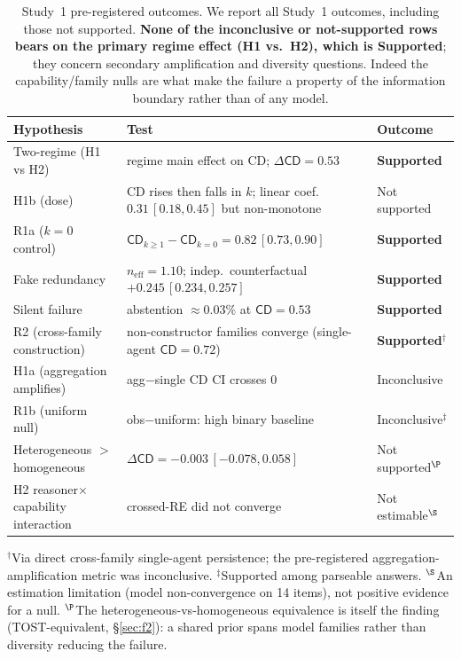 \documentclass[acmsmall,screen,review,anonymous]{acmart}
\newcommand{\cd}{\textsf{CD}}
\newcommand{\neff}{\ensuremath{n_{\mathrm{eff}}}}
\begin{document}
\begin{table}[t]
\centering
\caption{Study~1 pre-registered outcomes. We report all Study~1 outcomes, including those not supported.
\textbf{None of the inconclusive or not-supported rows bears on the primary regime effect (H1 vs.\ H2),
which is Supported}; they concern secondary amplification and diversity questions. Indeed the
capability/family nulls are what make the failure a property of the information boundary rather than of any
model.}
\label{tab:outcomes}
\small
\begin{tabular}{p{3.4cm} p{4.6cm} l}
\toprule
Hypothesis & Test & Outcome \\
\midrule
Two-regime (H1 vs H2) & regime main effect on \cd{}; $\Delta\cd=0.53$ & \textbf{Supported} \\
H1b (dose) & \cd{} rises then falls in $k$; linear coef.\ $0.31\,[0.18,0.45]$ but non-monotone & Not supported \\
R1a ($k{=}0$ control) & $\cd_{k\ge1}-\cd_{k=0}=0.82\,[0.73,0.90]$ & \textbf{Supported} \\
Fake redundancy & $\neff=1.10$; indep.\ counterfactual $+0.245\,[0.234,0.257]$ & \textbf{Supported} \\
Silent failure & abstention $\approx\!0.03\%$ at $\cd=0.53$ & \textbf{Supported} \\
R2 (cross-family construction) & non-constructor families converge (single-agent $\cd=0.72$) & \textbf{Supported}$^\dagger$ \\
\midrule
H1a (aggregation amplifies) & agg$-$single \cd{} CI crosses 0 & Inconclusive \\
R1b (uniform null) & obs$-$uniform: high binary baseline & Inconclusive$^\ddagger$ \\
Heterogeneous $>$ homogeneous & $\Delta\cd=-0.003\,[-0.078,0.058]$ & Not supported$^\P$ \\
H2 reasoner$\times$capability interaction & crossed-RE did not converge & Not estimable$^\S$ \\
\bottomrule
\end{tabular}
\par\smallskip
\footnotesize $^\dagger$Via direct cross-family single-agent persistence; the pre-registered
aggregation-amplification metric was inconclusive. $^\ddagger$Supported among parseable
answers. $^\S$An estimation limitation (model non-convergence on 14 items), not positive evidence for a null.
$^\P$The heterogeneous-vs-homogeneous equivalence is itself the finding (TOST-equivalent, \S\ref{sec:f2}):
a shared prior spans model families rather than diversity reducing the failure.
\end{table}
\end{document}
